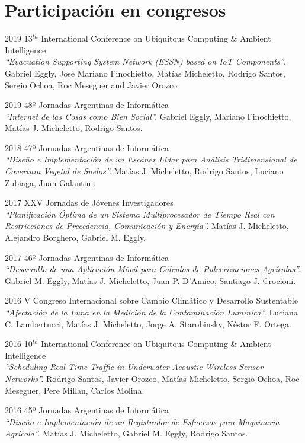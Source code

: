 \documentclass[letterpaper]{twentysecondcv} %
\begin{document}
\vspace{2mm}

\section{Participación en congresos}

\begin{twenty}
\twentyitem
    {2019}
    {}
    {13$^{th}$ International Conference on Ubiquitous Computing \& Ambient Intelligence\\} 
    {\textit{``Evacuation Supporting System Network (ESSN) based on IoT Components''.}}
    {Gabriel Eggly, José Mariano Finochietto, Matías Micheletto, Rodrigo Santos, Sergio Ochoa, Roc Meseguer and Javier Orozco}

\twentyitem
    {2019}
    {}
    {48º Jornadas Argentinas de Informática\\} 
    {\textit{``Internet de las Cosas como Bien Social''.}}
    {Gabriel Eggly, Mariano Finochietto, Matías J. Micheletto, Rodrigo Santos.}
    
\twentyitem
    {2018}
    {}
    {47º Jornadas Argentinas de Informática\\}
    {\textit{``Diseño e Implementación de un Escáner Lidar para Análisis Tridimensional de Covertura Vegetal de Suelos''.}}
    {Matías J. Micheletto, Rodrigo Santos, Luciano Zubiaga, Juan Galantini.}

\twentyitem
    {2017}
    {}
    {XXV Jornadas de Jóvenes Investigadores\\}
    {\textit{``Planificación Óptima de un Sistema Multiprocesador de Tiempo Real con Restricciones de Precedencia, Comunicación y Energía''.}}
    {Matías J. Micheletto, Alejandro Borghero, Gabriel M. Eggly.}
    
\twentyitem
    {2017}
    {}
    {46º Jornadas Argentinas de Informática\\}
    {\textit{``Desarrollo de una Aplicación Móvil para Cálculos de Pulverizaciones Agrícolas''.}}
    {Gabriel M. Eggly, Matías J. Micheletto, Juan P. D'Amico, Santiago J. Crocioni.}
    
\twentyitem
    {2016}
    {}
    {V Congreso Internacional sobre Cambio Climático y Desarrollo Sustentable\\}
    {\textit{``Afectación de la Luna en la Medición de la Contaminación Lumínica''.}}
    {Luciana C. Lambertucci, Matías J. Micheletto, Jorge A. Starobinsky, Néstor F. Ortega.}
    
\twentyitem
    {2016}
    {}
    {10$^{th}$ International Conference on Ubiquitous Computing \& Ambient Intelligence\\}
    {\textit{``Scheduling Real-Time Traffic in Underwater Acoustic Wireless Sensor Networks''.}}
    {Rodrigo Santos, Javier Orozco, Matías Micheletto, Sergio Ochoa, Roc Meseguer, Pere Millan, Carlos Molina.}
    
\twentyitem
    {2016}
    {}
    {45º Jornadas Argentinas de Informática\\}
    {\textit{``Diseño e Implementación de un Registrador de Esfuerzos para Maquinaria Agrícola''.}}
    {Matías J. Micheletto, Gabriel M. Eggly, Rodrigo Santos.}
    
\end{twenty}
\end{document}
